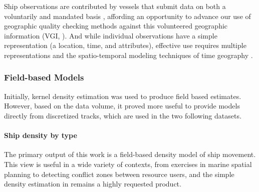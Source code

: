 Ship observations are contributed by vessels that submit data on both a voluntarily and mandated basis \citep{VOSClim,Tetreault2002}, affording an opportunity to advance our use of geographic quality checking methods \citep{goodchildli2012} against this volunteered geographic information (VGI, \cite{goodchild2007citizens}). And while individual observations have a simple representation (a location, time, and attributes), effective use requires multiple representations \citep{Goodchild1992} and the spatio-temporal modeling techniques of time geography \citep{miller2008field}.


\subsubsection{Field-based Models}

Initially, kernel density estimation was used to produce field based estimates. However, based on the data volume, it proved more useful to provide models directly from discretized tracks, which are used in the two following datasets.

\paragraph{Ship density by type}

The primary output of this work is a field-based density model of ship movement. This view is useful in a wide variety of contexts, from exercises in marine spatial planning to detecting conflict zones between resource users, and the simple density estimation in \cite{Halpern2008} remains a highly requested product. %

